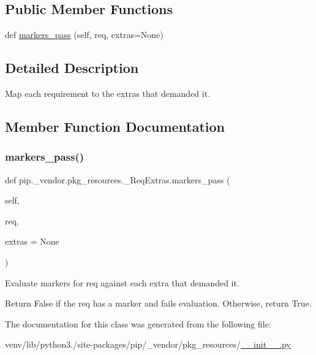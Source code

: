 \subsection*{Public Member Functions}
\begin{DoxyCompactItemize}
\item 
def \hyperlink{classpip_1_1__vendor_1_1pkg__resources_1_1__ReqExtras_a1b0256ec9bc9da2aac912b35898fda5f}{markers\+\_\+pass} (self, req, extras=None)
\end{DoxyCompactItemize}


\subsection{Detailed Description}
\begin{DoxyVerb}Map each requirement to the extras that demanded it.
\end{DoxyVerb}
 

\subsection{Member Function Documentation}
\mbox{\label{classpip_1_1__vendor_1_1pkg__resources_1_1__ReqExtras_a1b0256ec9bc9da2aac912b35898fda5f}} 
\subsubsection{\texorpdfstring{markers\+\_\+pass()}{markers\_pass()}}
{\footnotesize\ttfamily def pip.\+\_\+vendor.\+pkg\+\_\+resources.\+\_\+\+Req\+Extras.\+markers\+\_\+pass (\begin{DoxyParamCaption}\item[{}]{self,  }\item[{}]{req,  }\item[{}]{extras = {\ttfamily None} }\end{DoxyParamCaption})}

\begin{DoxyVerb}Evaluate markers for req against each extra that
demanded it.

Return False if the req has a marker and fails
evaluation. Otherwise, return True.
\end{DoxyVerb}
 

The documentation for this class was generated from the following file\+:\begin{DoxyCompactItemize}
\item 
venv/lib/python3./site-\/packages/pip/\+\_\+vendor/pkg\+\_\+resources/\hyperlink{venv_2lib_2python3_89_2site-packages_2pip_2__vendor_2pkg__resources_2____init_____8py}{\+\_\+\+\_\+init\+\_\+\+\_\+.\+py}\end{DoxyCompactItemize}
